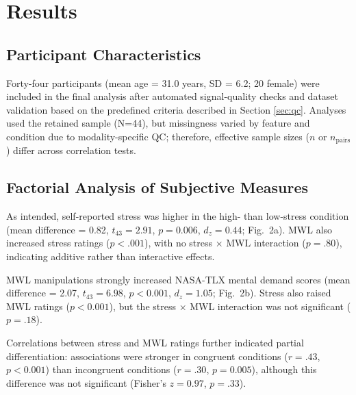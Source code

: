 \documentclass[lettersize,journal]{IEEEtran}
\begin{document}
\section{Results}

\subsection {Participant Characteristics}

Forty-four participants (mean age = 31.0 years, SD = 6.2; 20 female) were included in the final analysis after automated signal-quality checks and dataset validation based on the predefined criteria described in Section \ref{sec:qc}. Analyses used the retained sample (N=44), but missingness varied by feature and condition due to modality-specific QC; therefore, effective sample sizes ($n$ or $n_{\mathrm{pairs}}$) differ across correlation tests.

\subsection{Factorial Analysis of Subjective Measures}

As intended, self-reported stress was higher in the high- than low-stress condition (mean difference = 0.82, $t_{43}=2.91$, $p = 0.006$, $d_z = 0.44$; Fig.~2a). MWL also increased stress ratings ($p < .001$), with no stress × MWL interaction ($p = .80$), indicating additive rather than interactive effects. 

MWL manipulations strongly increased NASA-TLX mental demand scores (mean difference = 2.07, $t_{43}=6.98$, $p < 0.001$, $d_z = 1.05$; Fig.~2b). Stress also raised MWL ratings ($p < 0.001$), but the stress × MWL interaction was not significant ($p = .18$). 

Correlations between stress and MWL ratings further indicated partial differentiation: associations were stronger in congruent conditions ($r = .43$, $p < 0.001$) than incongruent conditions ($r = .30$, $p = 0.005$), although this difference was not significant (Fisher’s $z = 0.97$, $p = .33$).
\end{document}
